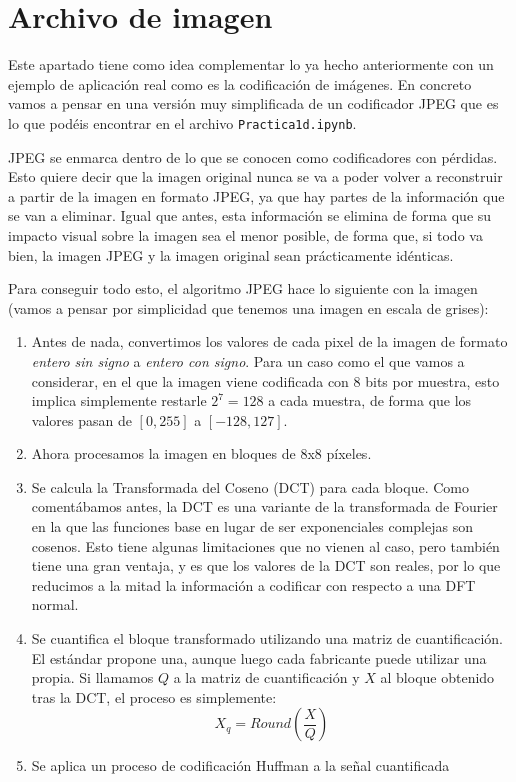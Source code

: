\documentclass[es,practica]{uah}
\begin{document}
\section{Archivo de imagen}

Este apartado tiene como idea complementar lo ya hecho anteriormente con un ejemplo de aplicación real como es la codificación de imágenes. En concreto vamos a pensar en una versión muy simplificada de un codificador JPEG que es lo que podéis encontrar en el archivo \texttt{Practica1d.ipynb}.

JPEG se enmarca dentro de lo que se conocen como codificadores con pérdidas. Esto quiere decir que la imagen original nunca se va a poder volver a reconstruir a partir de la imagen en formato JPEG, ya que hay partes de la información que se van a eliminar. Igual que antes, esta información se elimina de forma que su impacto visual sobre la imagen sea el menor posible, de forma que, si todo va bien, la imagen JPEG y la imagen original sean prácticamente idénticas. 

Para conseguir todo esto, el algoritmo JPEG hace lo siguiente con la imagen (vamos a pensar por simplicidad que tenemos una imagen en escala de grises):

\begin{enumerate}
\item Antes de nada, convertimos los valores de cada pixel de la imagen de formato \emph{entero sin signo} a \emph{entero con signo}. Para un caso como el que vamos a considerar, en el que la imagen viene codificada con 8 bits por muestra, esto implica simplemente restarle $2^7 = 128$ a cada muestra, de forma que los valores pasan de $[0, 255]$ a $[-128, 127]$.
\item Ahora procesamos la imagen en bloques de 8x8 píxeles.
\item Se calcula la Transformada del Coseno (DCT) para cada bloque. Como comentábamos antes, la DCT es una variante de la transformada de Fourier en la que las funciones base en lugar de ser exponenciales complejas son cosenos. Esto tiene algunas limitaciones que no vienen al caso, pero también tiene una gran ventaja, y es que los valores de la DCT son reales, por lo que reducimos a la mitad la información a codificar con respecto a una DFT normal.
\item Se cuantifica el bloque transformado utilizando una matriz de cuantificación. El estándar propone una, aunque luego cada fabricante puede utilizar una propia. Si llamamos $Q$ a la matriz de cuantificación y $X$ al bloque obtenido tras la DCT, el proceso es simplemente:
\begin{equation}
	X_q = Round \left ( \frac{X}{Q} \right )
\end{equation}
\item Se aplica un proceso de codificación Huffman a la señal cuantificada
\end{enumerate}
\end{document}
